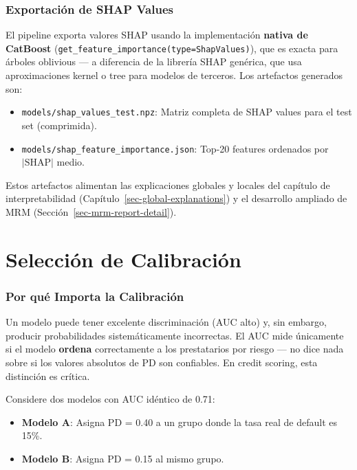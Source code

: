 \documentclass[
  spanish,
  11pt,
  letterpaper,
]{scrbook}
\providecommand{\tightlist}{%
  \setlength{\itemsep}{0pt}\setlength{\parskip}{0pt}}
\theoremstyle{plain}
\theoremstyle{remark}
\begin{document}
\subsection{Exportación de SHAP Values}\label{sec-shap-export}

El pipeline exporta valores SHAP usando la implementación \textbf{nativa
de CatBoost}
(\texttt{get\_feature\_importance(type=\textquotesingle{}ShapValues\textquotesingle{})}),
que es exacta para árboles oblivious --- a diferencia de la librería
SHAP genérica, que usa aproximaciones kernel o tree para modelos de
terceros. Los artefactos generados son:

\begin{itemize}
\tightlist
\item
  \texttt{models/shap\_values\_test.npz}: Matriz completa de SHAP values
  para el test set (comprimida).
\item
  \texttt{models/shap\_feature\_importance.json}: Top-20 features
  ordenados por \(|\text{SHAP}|\) medio.
\end{itemize}

Estos artefactos alimentan las explicaciones globales y locales del
capítulo de interpretabilidad (Capítulo~\ref{sec-global-explanations}) y
el desarrollo ampliado de MRM (Sección~\ref{sec-mrm-report-detail}).

\chapter{Selección de Calibración}\label{sec-calibration-selection}

\subsection{Por qué Importa la
Calibración}\label{por-quuxe9-importa-la-calibraciuxf3n}

Un modelo puede tener excelente discriminación (AUC alto) y, sin
embargo, producir probabilidades sistemáticamente incorrectas. El AUC
mide únicamente si el modelo \textbf{ordena} correctamente a los
prestatarios por riesgo --- no dice nada sobre si los valores absolutos
de PD son confiables. En credit scoring, esta distinción es crítica.

Considere dos modelos con AUC idéntico de 0.71:

\begin{itemize}
\tightlist
\item
  \textbf{Modelo A}: Asigna PD = 0.40 a un grupo donde la tasa real de
  default es 15\%.
\item
  \textbf{Modelo B}: Asigna PD = 0.15 al mismo grupo.
\end{itemize}
\end{document}
